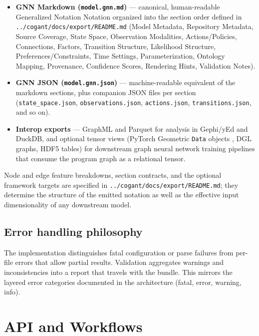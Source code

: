 \documentclass[
]{article}
\providecommand{\tightlist}{%
  \setlength{\itemsep}{0pt}\setlength{\parskip}{0pt}}
\begin{document}
\begin{itemize}
\tightlist
\item
  \textbf{GNN Markdown (\texttt{model.gnn.md})} --- canonical,
  human-readable Generalized Notation Notation organized into the
  section order defined in \texttt{../cogant/docs/export/README.md}
  (Model Metadata, Repository Metadata, Source Coverage, State Space,
  Observation Modalities, Actions/Policies, Connections, Factors,
  Transition Structure, Likelihood Structure, Preferences/Constraints,
  Time Settings, Parameterization, Ontology Mapping, Provenance,
  Confidence Scores, Rendering Hints, Validation Notes).
\item
  \textbf{GNN JSON (\texttt{model.gnn.json})} --- machine-readable
  equivalent of the markdown sections, plus companion JSON files per
  section (\texttt{state\_space.json}, \texttt{observations.json},
  \texttt{actions.json}, \texttt{transitions.json}, and so on).
\item
  \textbf{Interop exports} --- GraphML and Parquet for analysis in
  Gephi/yEd and DuckDB, and optional tensor views (PyTorch Geometric
  \texttt{Data} objects \citep{fey2019pyg}, DGL graphs, HDF5 tables) for
  downstream graph neural network training pipelines that consume the
  program graph as a relational tensor.
\end{itemize}

Node and edge feature breakdowns, section contracts, and the optional
framework targets are specified in
\texttt{../cogant/docs/export/README.md}; they determine the structure
of the emitted notation as well as the effective input dimensionality of
any downstream model.

\subsection{Error handling philosophy}\label{error-handling-philosophy}

The implementation distinguishes fatal configuration or parse failures
from per-file errors that allow partial results. Validation aggregates
warnings and inconsistencies into a report that travels with the bundle.
This mirrors the layered error categories documented in the architecture
(fatal, error, warning, info).

\newpage

\section{API and Workflows}\label{api-and-workflows}
\end{document}
